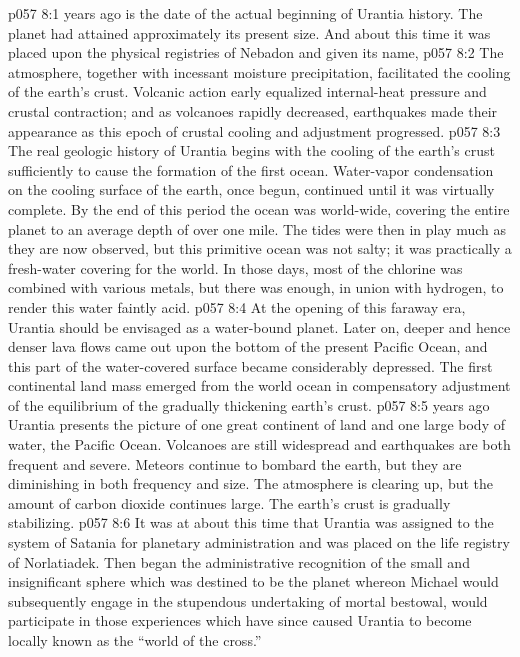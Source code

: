 \vs p057 8:1  years ago is the date of the actual beginning of Urantia history. The planet had attained approximately its present size. And about this time it was placed upon the physical registries of Nebadon and given its name, 
\vs p057 8:2 The atmosphere, together with incessant moisture precipitation, facilitated the cooling of the earth’s crust. Volcanic action early equalized internal\hyp{}heat pressure and crustal contraction; and as volcanoes rapidly decreased, earthquakes made their appearance as this epoch of crustal cooling and adjustment progressed.
\vs p057 8:3 The real geologic history of Urantia begins with the cooling of the earth’s crust sufficiently to cause the formation of the first ocean. Water\hyp{}vapor condensation on the cooling surface of the earth, once begun, continued until it was virtually complete. By the end of this period the ocean was world\hyp{}wide, covering the entire planet to an average depth of over one mile. The tides were then in play much as they are now observed, but this primitive ocean was not salty; it was practically a fresh\hyp{}water covering for the world. In those days, most of the chlorine was combined with various metals, but there was enough, in union with hydrogen, to render this water faintly acid.
\vs p057 8:4 At the opening of this faraway era, Urantia should be envisaged as a water\hyp{}bound planet. Later on, deeper and hence denser lava flows came out upon the bottom of the present Pacific Ocean, and this part of the water\hyp{}covered surface became considerably depressed. The first continental land mass emerged from the world ocean in compensatory adjustment of the equilibrium of the gradually thickening earth’s crust.
\pc \vs p057 8:5  years ago Urantia presents the picture of one great continent of land and one large body of water, the Pacific Ocean. Volcanoes are still widespread and earthquakes are both frequent and severe. Meteors continue to bombard the earth, but they are diminishing in both frequency and size. The atmosphere is clearing up, but the amount of carbon dioxide continues large. The earth’s crust is gradually stabilizing.
\vs p057 8:6 It was at about this time that Urantia was assigned to the system of Satania for planetary administration and was placed on the life registry of Norlatiadek. Then began the administrative recognition of the small and insignificant sphere which was destined to be the planet whereon Michael would subsequently engage in the stupendous undertaking of mortal bestowal, would participate in those experiences which have since caused Urantia to become locally known as the “world of the cross.”
